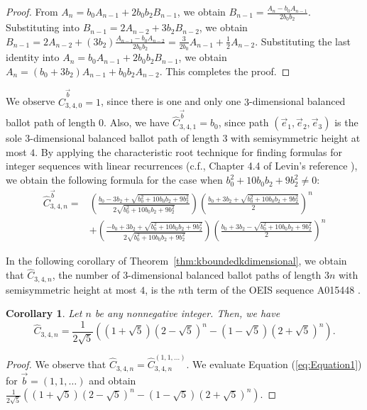\documentclass[11pt]{article}
\newtheorem{corollary}[theorem]{Corollary}
\theoremstyle{remark}
\theoremstyle{definition}
\begin{document}
\begin{proof}
 From $A_n = b_0A_{n-1}+2b_0b_2B_{n-1}$, we obtain $B_{n-1} = \frac{A_n- b_0A_{n-1}}{2b_0b_2}$. Substituting into $B_{n-1} = 2A_{n-2}+3b_2B_{n-2}$, we obtain $B_{n-1}= 2A_{n-2} + (3b_2) \frac{A_{n-1}- b_0A_{n-2}}{2b_0b_2} = \frac{3}{2b_0}A_{n-1} +\frac{1}{2}A_{n-2}$. Substituting the last identity into $A_n = b_0A_{n-1}+2b_0b_2B_{n-1}$, we obtain $ A_n = (b_0+3b_2) A_{n-1} + b_0b_2A_{n-2}$. This completes the proof.
\end{proof}

We observe $\widehat{C}_{3, 4, 0}^{\vec{b}} = 1$, since there is one and only one $3$-dimensional balanced ballot path of length $0$. Also, we have $\widehat{C}_{3, 4, 1}^{\vec{b}} = b_0$, since path $(\vec{e}_1, \vec{e}_2, \vec{e}_3)$ is the sole 3-dimensional balanced ballot path of length $3$ with semisymmetric height at most $4$. By applying the characteristic root technique for finding formulas for integer sequences with linear recurrences (c.f., Chapter 4.4 of Levin's reference \cite{levin2025discrete}), we obtain the following formula for the case when $b_0^2+10b_0b_2+9b_2^2 \neq 0$:
 \begin{equation}\label{eq:Equation1}\begin{split}
     \widehat{C}_{3, 4, n}^{\vec{b}} = &   \left(\frac{b_0-3b_2+\sqrt{b_0^2+10b_0b_2+9b_2^2}}{2\sqrt{b_0^2+10b_0b_2+9b_2^2}}\right)  \left(\frac{b_0+3b_2 + \sqrt{b_0^2+10b_0b_2+9b_2^2}}{2}\right)^n \\ & + \left(\frac{-b_0+3b_2+\sqrt{b_0^2+10b_0b_2+9b_2^2}}{2\sqrt{b_0^2+10b_0b_2+9b_2^2}}\right) \left(\frac{b_0+3b_2 - \sqrt{b_0^2+10b_0b_2+9b_2^2}}{2}\right)^n\end{split}
 \end{equation}
 

In the following corollary of Theorem~\ref{thm:kboundedkdimensional}, we obtain that $\widehat{C}_{3, 4, n}$, the number of $3$-dimensional balanced ballot paths of length $3n$ with semisymmetric height at most $4$, is the $n$th term of the OEIS sequence A015448 \cite{oeis}.

\begin{corollary}\label{cor:OEISEquals}
    Let $n$ be any nonnegative integer. Then, we have $$\widehat{C}_{3, 4, n} = \frac{1}{2\sqrt{5}}\left( (1+\sqrt{5})(2-\sqrt{5})^n - (1-\sqrt{5})(2+\sqrt{5})^n\right).$$ 
\end{corollary}
\begin{proof}
We observe that $\widehat{C}_{3, 4, n} = \widehat{C}_{3, 4, n}^{(1, 1, \dots)}$. We evaluate Equation (\ref{eq:Equation1}) for $\vec{b} = (1, 1, \dots)$ and obtain $\frac{1}{2\sqrt{5}}\left( (1+\sqrt{5})(2-\sqrt{5})^n - (1-\sqrt{5})(2+\sqrt{5})^n\right)$.
\end{proof}
\end{document}
